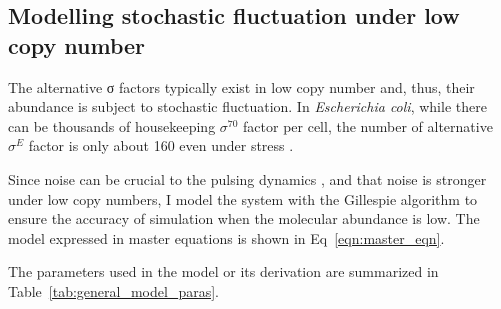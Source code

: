 \subsection{Modelling stochastic fluctuation under low copy number}

The alternative σ factors typically exist in low copy number and,
thus, their abundance is subject to stochastic fluctuation.
In \textit{Escherichia coli}, while there can be thousands of housekeeping
$\sigma^{70}$ factor per cell, the number of alternative $\sigma^E$
factor is only about 160 even under stress \cite{collinet00}.


Since noise can be crucial to the pulsing dynamics \cite{park18a},
and that noise is stronger under low copy numbers,
I model the system with the Gillespie algorithm to ensure the 
accuracy of simulation when the molecular abundance is low.
The model expressed in master equations is shown in
Eq~\ref{eqn:master_eqn}.




The parameters used in the model or its derivation are summarized
in Table~\ref{tab:general_model_paras}.

